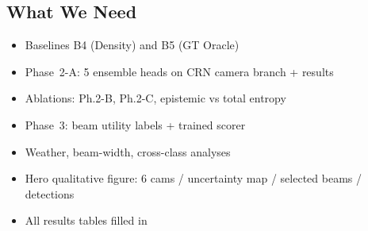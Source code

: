 \documentclass[12pt, a4paper]{article}
\theoremstyle{definition}
\begin{document}
\subsection*{What We Need}
\begin{itemize}[leftmargin=2em]
  \item[\textcolor{inprogressorange}{\textbf{>}}]
        Baselines B4 (Density) and B5 (GT Oracle)
  \item[\textcolor{inprogressorange}{\textbf{>}}]
        Phase~2-A: 5 ensemble heads on CRN camera branch + results
  \item[\textcolor{plannedpurple}{\textbf{o}}]
        Ablations: Ph.2-B, Ph.2-C, epistemic vs total entropy
  \item[\textcolor{plannedpurple}{\textbf{o}}]
        Phase~3: beam utility labels + trained scorer
  \item[\textcolor{plannedpurple}{\textbf{o}}]
        Weather, beam-width, cross-class analyses
  \item[\textcolor{plannedpurple}{\textbf{o}}]
        Hero qualitative figure: 6 cams / uncertainty map / selected beams / detections
  \item[\textcolor{plannedpurple}{\textbf{o}}]
        All results tables filled in
\end{itemize}
\end{document}
